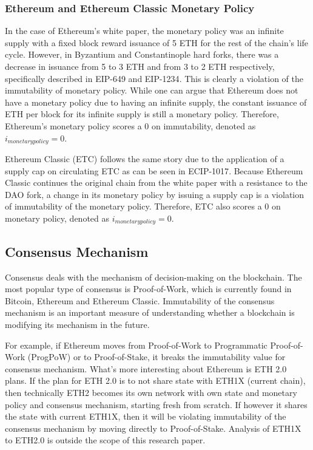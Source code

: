 \documentclass{article}
\begin{document}
\subsubsection{Ethereum and Ethereum Classic Monetary Policy}
In the case of Ethereum's white paper\cite{ethpaper}, the monetary policy was an infinite supply with a fixed block reward issuance of 5 ETH for the rest of the chain’s life cycle. However, in Byzantium and Constantinople hard forks, there was a decrease in issuance from 5 to 3 ETH and from 3 to 2 ETH respectively, specifically described in EIP-649\cite{eip649} and EIP-1234\cite{eip1234}. This is clearly a violation of the immutability of monetary policy. While one can argue that Ethereum does not have a monetary policy due to having an infinite supply, the constant issuance of ETH per block for its infinite supply is still a monetary policy. Therefore, Ethereum's monetary policy scores a 0 on immutability, denoted as $i_{monetarypolicy} = 0$.

Ethereum Classic (ETC) follows the same story due to the application of a supply cap on circulating ETC as can be seen in ECIP-1017\cite{ecip1017}. Because Ethereum Classic continues the original chain from the white paper with a resistance to the DAO fork, a change in its monetary policy by issuing a supply cap is a violation of immutability of the monetary policy. Therefore, ETC also scores a 0 on monetary policy, denoted as $i_{monetarypolicy} = 0$.

\subsection{Consensus Mechanism}
Consensus deals with the mechanism of decision-making on the blockchain. The most popular type of consensus is Proof-of-Work\cite{pow}, which is currently found in Bitcoin, Ethereum and Ethereum Classic. Immutability of the consensus mechanism is an important measure of understanding whether a blockchain is modifying its mechanism in the future.

For example, if Ethereum moves from Proof-of-Work to Programmatic Proof-of-Work (ProgPoW)\cite{progpow} or to Proof-of-Stake, it breaks the immutability value for consensus mechanism. What's more interesting about Ethereum is ETH 2.0 plans. If the plan for ETH 2.0 is to not share state with ETH1X (current chain), then technically ETH2 becomes its own network with own state and monetary policy and consensus mechanism, starting fresh from scratch. If however it shares the state with current ETH1X, then it will be violating immutability of the consensus mechanism by moving directly to Proof-of-Stake. Analysis of ETH1X to ETH2.0 is outside the scope of this research paper.
\end{document}
